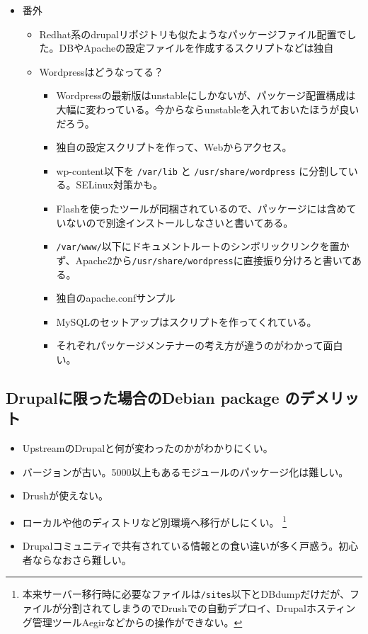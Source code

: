 \documentclass[mingoth,a4paper]{jsarticle}
\begin{document}
\begin{itemize}
\begin{itemize}
  \item 番外
    \begin{itemize}
    \item Redhat系のdrupalリポジトリも似たようなパッケージファイル配置でした。DBやApacheの設定ファイルを作成するスクリプトなどは独自
    \item Wordpressはどうなってる？
      \begin{itemize}
      \item Wordpressの最新版はunstableにしかないが、パッケージ配置構成は大幅に変わっている。今からならunstableを入れておいたほうが良いだろう。
      \item 独自の設定スクリプトを作って、Webからアクセス。
      \item wp-content以下を {\tt /var/lib} と {\tt /usr/share/wordpress} に分割している。SELinux対策かも。
      \item Flashを使ったツールが同梱されているので、パッケージには含めていないので別途インストールしなさいと書いてある。
      \item {\tt /var/www/}以下にドキュメントルートのシンボリックリンクを置かず、Apache2から{\tt /usr/share/wordpress}に直接振り分けろと書いてある。
      \item 独自のapache.confサンプル
      \item MySQLのセットアップはスクリプトを作ってくれている。
      \item それぞれパッケージメンテナーの考え方が違うのがわかって面白い。
      \end{itemize}
    \end{itemize}
  \end{itemize}
\end{itemize}

\subsection{Drupalに限った場合のDebian package のデメリット}
\begin{itemize}
\item UpstreamのDrupalと何が変わったのかがわかりにくい。
\item バージョンが古い。5000以上もあるモジュールのパッケージ化は難しい。
\item Drushが使えない。
\item ローカルや他のディストリなど別環境へ移行がしにくい。
  \footnote{本来サーバー移行時に必要なファイルは{\tt /sites}以下とDBdumpだけだが、ファイルが分割されてしまうのでDrushでの自動デプロイ、Drupalホスティング管理ツールAegirなどからの操作ができない。\cite{aegir}}


\item Drupalコミュニティで共有されている情報との食い違いが多く戸惑う。初心者ならなおさら難しい。
\end{itemize}
\end{document}
